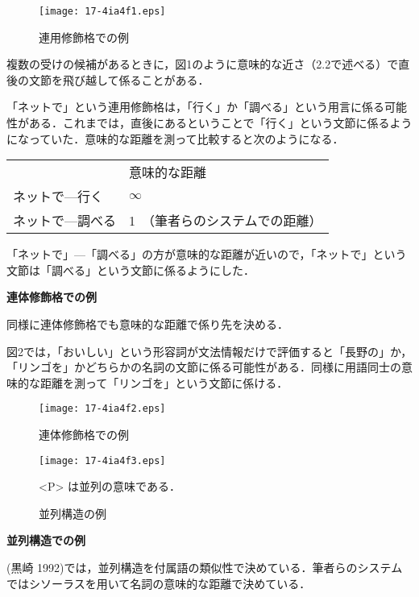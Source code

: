 \documentclass[japanese]{jnlp_1.4}
\begin{document}
\begin{figure}[b]
 \begin{center}
\texttt{[image: 17-4ia4f1.eps]}
 \end{center}
 \caption{連用修飾格での例}
 \label{fig:one}
\end{figure}

複数の受けの候補があるときに，図1のように意味的な近さ（2.2で述べる）で直後の文節を飛び越して係ることがある．

「ネットで」という連用修飾格は，「行く」か「調べる」という用言に係る可能性がある．これまでは，直後にあるということで「行く」という文節に係るようになっていた．意味的な距離を測って比較すると次のようになる．

\vspace{0.3zw}
\begin{tabular}{ll}
 	& 意味的な距離 \\
 ネットで—行く & $\infty$ \\
 ネットで—調べる & 1　（筆者らのシステムでの距離）
\end{tabular}
\vspace{0.3zw}

「ネットで」—「調べる」の方が意味的な距離が近いので，「ネットで」という文節は「調べる」という文節に係るようにした．

{\bfseries 連体修飾格での例}

同様に連体修飾格でも意味的な距離で係り先を決める．

図2では，「おいしい」という形容詞が文法情報だけで評価すると「長野の」か，「リンゴを」かどちらかの名詞の文節に係る可能性がある．同様に用語同士の意味的な距離を測って「リンゴを」という文節に係ける．

\begin{figure}[t]
 \begin{center}
\texttt{[image: 17-4ia4f2.eps]}
 \end{center}
 \caption{連体修飾格での例}
 \label{fig:2}
\end{figure}
\begin{figure}[t]
 \begin{center}
\texttt{[image: 17-4ia4f3.eps]}
 \end{center}
 \caption{並列構造の例}
\begin{center}
\small {\textless}P{\textgreater} は並列の意味である．
\end{center}
 \label{fig:3}
\end{figure}


{\bfseries 並列構造での例}

 (黒崎 1992)では，並列構造を付属語の類似性で決めている．筆者らのシステムではシソーラスを用いて名詞の意味的な距離で決めている．
\end{document}
